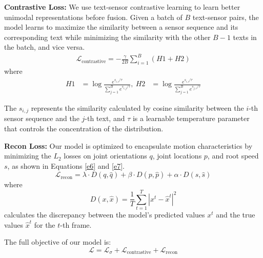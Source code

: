 \documentclass[letterpaper]{article} %
\begin{document}
\textbf{Contrastive Loss:} We use text-sensor contrastive learning to learn better unimodal representations before fusion. Given a batch of $B$ text-sensor pairs, the model learns to maximize the similarity between a sensor sequence and its corresponding text while minimizing the similarity with the other $B-1$ texts in the batch, and vice versa.
\begin{align}
\mathcal{L}_{\text{contrastive}} = -\frac{\gamma}{2B} \sum_{i=1}^{B} \left(H1 + H2 \right)
\label{e4}
\end{align}
where
\begin{align}
H1 & = \log \frac{e^{s_{i, i} / \tau}}{\sum_{j=1}^{B}e^{s_{i, j} / \tau}}, \
H2 & = \log \frac{e^{s_{i, i} / \tau}}{\sum_{j=1}^{B}e^{s_{j, i} / \tau}}
\label{e5}
\end{align}

The $s_{i, j}$ represents the similarity calculated by cosine similarity between the $i$-th sensor sequence and the $j$-th text, and $\tau$ is a learnable temperature parameter that controls the concentration of the distribution.

\textbf{Recon Loss:} Our model is optimized to encapsulate motion characteristics by minimizing the $L_2$ losses on joint orientations $q$, joint locations $p$, and root speed $s$, as shown in Equations \eqref{e6} and \eqref{e7}.
\begin{equation}
\mathcal{L}_{\text{recon}} = \lambda \cdot {D}(q, \hat{q})+ \beta \cdot {D}(p, \hat{p}) + \alpha \cdot {D}(s, \hat{s})
\label{e6}
\end{equation}
where
\begin{equation}
{D}(x, \hat{x}) = \frac{1}{T}\sum_{t=1}^T\left|x^t-\hat{x}^t\right|^2
\label{e7}
\end{equation}
calculates the discrepancy between the model's predicted values $x^t$ and the true values $\hat{x}^t$ for the $t$-th frame.

The full objective of our model is:
 \begin{equation}
 \mathcal{L}=\mathcal{L}_\sigma+\mathcal{L}_{\text {contrastive}}+\mathcal{L}_{\text {recon}}
\end{equation}
\end{document}
